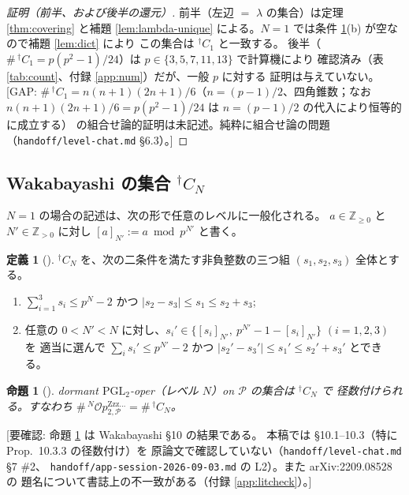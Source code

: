 \documentclass[a4paper,11pt]{ltjsarticle}
\theoremstyle{plain}
\newtheorem{proposition}[theorem]{命題}
\theoremstyle{definition}
\newtheorem{definition}[theorem]{定義}
\newcommand{\GAP}[1]{\textcolor{orange!85!black}{\textsf{[GAP: #1]}}}
\newcommand{\NeedsCheck}[1]{\textcolor{blue!70!black}{\textsf{[要確認: #1]}}}
\newcommand{\bbZ}{\mathbb{Z}}
\newcommand{\sP}{\mathscr{P}}
\newcommand{\Op}{\mathcal{O}p}
\newcommand{\Zzz}{\mathrm{Zzz\dots}}
\begin{document}
\begin{proof}[証明（前半、および後半の還元）]
前半（左辺 $=$ $\lambda$ の集合）は定理 \ref{thm:covering} と補題 \ref{lem:lambda-unique}
による。$N=1$ では条件 \ref{def:Cdagger}(b) が空なので補題 \ref{lem:dict} により
この集合は ${}^{\dagger}C_1$ と一致する。
後半（$\#\,{}^{\dagger}C_1=p(p^2-1)/24$）は $p\in\{3,5,7,11,13\}$ で計算機により
確認済み（表 \ref{tab:count}、付録 \ref{app:num}）だが、一般 $p$ に対する
証明は与えていない。
\GAP{$\#\,{}^{\dagger}C_1=n(n+1)(2n+1)/6$（$n=(p-1)/2$、四角錐数；なお
$n(n+1)(2n+1)/6=p(p^2-1)/24$ は $n=(p-1)/2$ の代入により恒等的に成立する）
の組合せ論的証明は未記述。純粋に組合せ論の問題
（\texttt{handoff/level-chat.md} \S6.3）。}
\end{proof}

\subsection{Wakabayashi の集合 ${}^{\dagger}C_N$}\label{ss:Cdagger}

$N=1$ の場合の記述は、次の形で任意のレベルに一般化される。
$a\in\bbZ_{\ge0}$ と $N'\in\bbZ_{>0}$ に対し $[a]_{N'}:=a\bmod p^{N'}$ と書く。

\begin{definition}[{\cite[(10.6)]{Wak2}}]\label{def:Cdagger}
${}^{\dagger}C_N$ を、次の二条件を満たす非負整数の三つ組 $(s_1,s_2,s_3)$ 全体とする。
\begin{enumerate}[label=(\alph*),leftmargin=2em]
\item $\displaystyle\sum_{i=1}^3 s_i\le p^N-2$ かつ $|s_2-s_3|\le s_1\le s_2+s_3$;
\item 任意の $0<N'<N$ に対し、$s_i'\in\{[s_i]_{N'},\ p^{N'}-1-[s_i]_{N'}\}$ $(i=1,2,3)$ を
      適当に選んで $\sum_i s_i'\le p^{N'}-2$ かつ $|s_2'-s_3'|\le s_1'\le s_2'+s_3'$
      とできる。
\end{enumerate}
\end{definition}

\begin{proposition}[{\cite[Prop.~10.1.4, 10.3.3]{Wak2}}]\label{prop:Cdagger}
dormant $\mathrm{PGL}_2$-oper（レベル $N$）on $\sP$ の集合は ${}^{\dagger}C_N$ で
径数付けられる。すなわち $\#\,{}^N\Op^{\Zzz}_{2,\sP}=\#\,{}^{\dagger}C_N$。
\end{proposition}

\NeedsCheck{命題 \ref{prop:Cdagger} は Wakabayashi \cite{Wak2} \S10 の結果である。
本稿では \cite{Wak2} \S10.1--10.3（特に Prop.~10.3.3 の径数付け）を
原論文で確認していない（\texttt{handoff/level-chat.md} \S7 \#2、
\texttt{handoff/app-session-2026-09-03.md} の L2）。また arXiv:2209.08528 の
題名について書誌上の不一致がある（付録 \ref{app:litcheck}）。}
\end{document}
